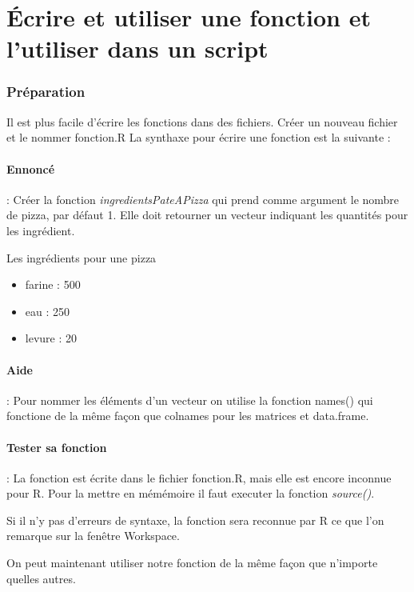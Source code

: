 \section{Écrire et utiliser une fonction et l'utiliser dans un script}
\subsubsection{Préparation}
Il est plus facile d'écrire les fonctions dans des fichiers. Créer un nouveau fichier et le nommer fonction.R
La synthaxe pour écrire une fonction est la suivante : 

\paragraph{Ennoncé} : Créer la fonction \emph{ingredientsPateAPizza} qui prend comme argument le nombre de pizza, par défaut 1. Elle doit retourner un vecteur indiquant les quantités pour les ingrédient.\par
Les ingrédients pour une pizza
\begin{itemize}
	\item farine : 500
	\item eau : 250
	\item levure : 20
\end{itemize}

\paragraph{Aide} : Pour nommer les éléments d'un vecteur on utilise la fonction names() qui fonctione de la même façon que colnames pour les matrices et data.frame.

\paragraph{Tester sa fonction} : La fonction est écrite dans le fichier fonction.R, mais elle est encore inconnue pour R. Pour la mettre en mémémoire il faut executer la fonction  \emph{source()}.

Si il n'y pas d'erreurs de syntaxe, la fonction sera reconnue par R ce que l'on remarque sur la fenêtre Workspace.
\par
On peut maintenant utiliser notre fonction de la même façon que n'importe quelles autres.

















